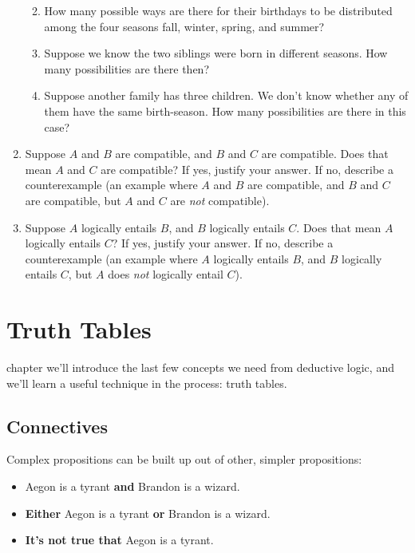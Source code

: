 \documentclass[justified]{tufte-book}
\providecommand{\tightlist}{%
  \setlength{\itemsep}{0pt}\setlength{\parskip}{0pt}}
\theoremstyle{definition}
\theoremstyle{definition}
\theoremstyle{definition}
\theoremstyle{definition}
\theoremstyle{remark}
\begin{document}
\begin{enumerate}
  \begin{enumerate}
  \def\labelenumii{\alph{enumii}.}
  \tightlist
  \item
    How many possible ways are there for their birthdays to be distributed among the four seasons fall, winter, spring, and summer?
  \item
    Suppose we know the two siblings were born in different seasons. How many possibilities are there then?
  \item
    Suppose another family has three children. We don't know whether any of them have the same birth-season. How many possibilities are there in this case?
  \end{enumerate}
\item
  Suppose \(A\) and \(B\) are compatible, and \(B\) and \(C\) are compatible. Does that mean \(A\) and \(C\) are compatible? If yes, justify your answer. If no, describe a counterexample (an example where \(A\) and \(B\) are compatible, and \(B\) and \(C\) are compatible, but \(A\) and \(C\) are \emph{not} compatible).
\item
  Suppose \(A\) logically entails \(B\), and \(B\) logically entails \(C\). Does that mean \(A\) logically entails \(C\)? If yes, justify your answer. If no, describe a counterexample (an example where \(A\) logically entails \(B\), and \(B\) logically entails \(C\), but \(A\) does \emph{not} logically entail \(C\)).
\end{enumerate}

\hypertarget{truth-tables}{%
\chapter{Truth Tables}\label{truth-tables}}

 chapter we'll introduce the last few concepts we need from deductive logic, and we'll learn a useful technique in the process: truth tables.

\hypertarget{connectives}{%
\section{Connectives}\label{connectives}}

Complex propositions can be built up out of other, simpler propositions:

\begin{itemize}
\tightlist
\item
  Aegon is a tyrant \textbf{and} Brandon is a wizard.
\item
  \textbf{Either} Aegon is a tyrant \textbf{or} Brandon is a wizard.
\item
  \textbf{It's not true that} Aegon is a tyrant.
\end{itemize}
\end{document}
